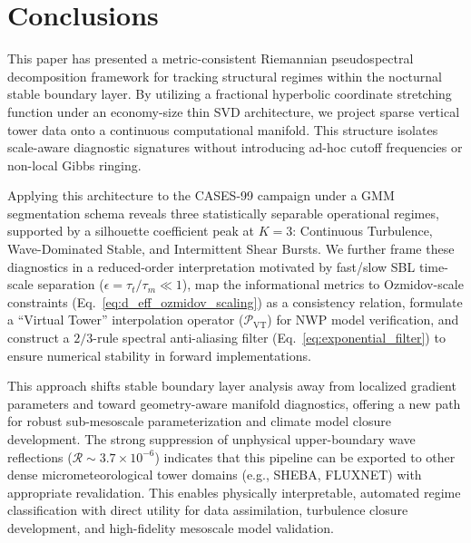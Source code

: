\section{Conclusions}
\label{sec:conclusions}

This paper has presented a metric-consistent Riemannian pseudospectral decomposition framework for tracking structural regimes within the nocturnal stable boundary layer. By utilizing a fractional hyperbolic coordinate stretching function under an economy-size thin SVD architecture, we project sparse vertical tower data onto a continuous computational manifold. This structure isolates scale-aware diagnostic signatures without introducing ad-hoc cutoff frequencies or non-local Gibbs ringing.

Applying this architecture to the CASES-99 campaign under a GMM segmentation schema reveals three statistically separable operational regimes, supported by a silhouette coefficient peak at $K=3$: Continuous Turbulence, Wave-Dominated Stable, and Intermittent Shear Bursts. We further frame these diagnostics in a reduced-order interpretation motivated by fast/slow SBL time-scale separation ($\epsilon = \tau_t/\tau_m \ll 1$), map the informational metrics to Ozmidov-scale constraints (Eq.~\ref{eq:d_eff_ozmidov_scaling}) as a consistency relation, formulate a ``Virtual Tower'' interpolation operator ($\mathcal{P}_{\mathrm{VT}}$) for NWP model verification, and construct a $2/3$-rule spectral anti-aliasing filter (Eq.~\ref{eq:exponential_filter}) to ensure numerical stability in forward implementations.

This approach shifts stable boundary layer analysis away from localized gradient parameters and toward geometry-aware manifold diagnostics, offering a new path for robust sub-mesoscale parameterization and climate model closure development. The strong suppression of unphysical upper-boundary wave reflections ($\mathcal{R} \sim 3.7 \times 10^{-6}$) indicates that this pipeline can be exported to other dense micrometeorological tower domains (e.g., SHEBA, FLUXNET) with appropriate revalidation. This enables physically interpretable, automated regime classification with direct utility for data assimilation, turbulence closure development, and high-fidelity mesoscale model validation.

